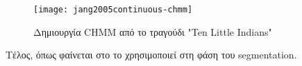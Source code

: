 \begin{figure}
    \centering
    \texttt{[image: jang2005continuous-chmm]}
    \caption{Δημιουργία CHMM από το τραγούδι "Ten Little Indians" \protect\cite{jang2005continuous}}
    \label{fig:jang2005continuous-chmm}
\end{figure}

Τέλος, όπως φαίνεται στο  το \cite{slaney2008locality} χρησιμοποιεί \hmm{} στη φάση του segmentation.

\undef{\hmm}
